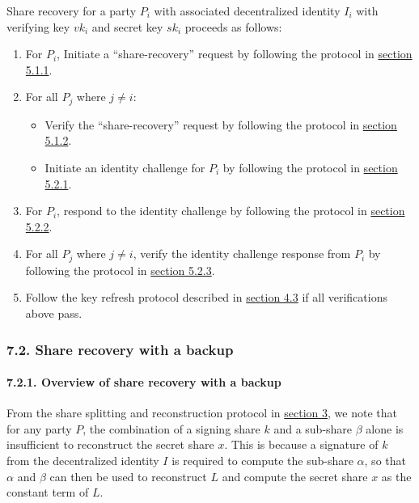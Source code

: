 \documentclass[
]{article}
\providecommand{\tightlist}{%
  \setlength{\itemsep}{0pt}\setlength{\parskip}{0pt}}
\begin{document}
Share recovery for a party \(P_i\) with associated decentralized
identity \(I_i\) with verifying key \(vk_i\) and secret key \(sk_i\)
proceeds as follows:

\begin{enumerate}
\def\labelenumi{\arabic{enumi}.}
\tightlist
\item
  For \(P_i\), Initiate a ``share-recovery'' request by following the
  protocol in
  \protect\hyperlink{identity-authed-request-initiation}{section 5.1.1}.
\item
  For all \(P_j\) where \(j \neq i\):

  \begin{itemize}
  \tightlist
  \item
    Verify the ``share-recovery'' request by following the protocol in
    \protect\hyperlink{identity-authed-request-verification}{section
    5.1.2}.
  \item
    Initiate an identity challenge for \(P_i\) by following the protocol
    in \protect\hyperlink{identity-challenge-initiation}{section 5.2.1}.
  \end{itemize}
\item
  For \(P_i\), respond to the identity challenge by following the
  protocol in \protect\hyperlink{identity-challenge-response}{section
  5.2.2}.
\item
  For all \(P_j\) where \(j \neq i\), verify the identity challenge
  response from \(P_i\) by following the protocol in
  \protect\hyperlink{identity-challenge-verification}{section 5.2.3}.
\item
  Follow the key refresh protocol described in
  \protect\hyperlink{key-refresh}{section 4.3} if all verifications
  above pass.
\end{enumerate}

\hypertarget{share-recovery-backup}{%
\subsubsection{7.2. Share recovery with a
backup}\label{share-recovery-backup}}

\hypertarget{share-recovery-backup-overview}{%
\paragraph{7.2.1. Overview of share recovery with a
backup}\label{share-recovery-backup-overview}}

From the share splitting and reconstruction protocol in
\protect\hyperlink{share-splitting-and-reconstruction}{section 3}, we
note that for any party \(P\), the combination of a signing share \(k\)
and a sub-share \(\beta\) alone is insufficient to reconstruct the
secret share \(x\). This is because a signature of \(k\) from the
decentralized identity \(I\) is required to compute the sub-share
\(\alpha\), so that \(\alpha\) and \(\beta\) can then be used to
reconstruct \(L\) and compute the secret share \(x\) as the constant
term of \(L\).
\end{document}
